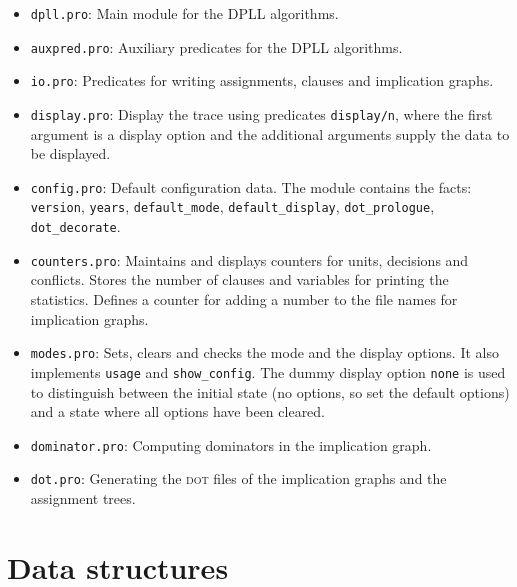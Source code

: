 \documentclass[11pt]{report}
\newcommand*{\p}[1]{\textup{\texttt{#1}}}
\newcommand*{\dt}{\textsc{dot}}
\begin{document}
\begin{itemize}
\item \p{dpll.pro}: Main module for the DPLL algorithms.\\

\item \p{auxpred.pro}: Auxiliary predicates for the DPLL algorithms. 

\item \p{io.pro}: Predicates for writing assignments, clauses and
implication graphs.

\item \p{display.pro}: Display the trace using predicates \p{display/n},
where the first argument is a display option and the additional
arguments supply the data to be displayed.

\item \p{config.pro}: Default configuration data. The module contains
the facts: \p{version}, \p{years}, \p{default\_mode},
\p{default\_display}, \p{dot\_prologue}, \p{dot\_decorate}.

\item \p{counters.pro}: Maintains and displays counters for units,
decisions and conflicts. Stores the number of clauses and variables for
printing the statistics. Defines a counter for adding a number to the
file names for implication graphs.

\item \p{modes.pro}: Sets, clears and checks the mode and the display
options. It also implements \p{usage} and \p{show\_config}. The dummy
display option \p{none} is used to distinguish between the initial state
(no options, so set the default options) and a state where all options
have been cleared.

\item \p{dominator.pro}: Computing dominators in the implication graph. 

\item \p{dot.pro}: Generating the \dt{} files of the implication graphs
and the assignment trees.
\end{itemize}

\newpage

\section{Data structures}
\end{document}
